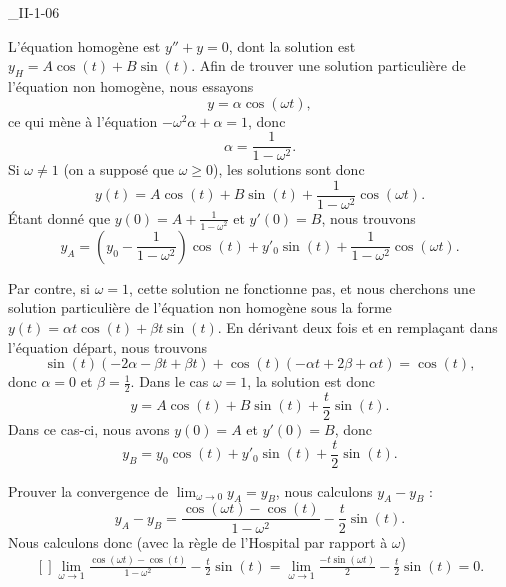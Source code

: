 

\begin{corrige}{_II-1-06}

L'équation homogène est $y''+y=0$, dont la solution est $y_H=A\cos(t)+B\sin(t)$. Afin de trouver une solution particulière de l'équation non homogène, nous essayons
\begin{equation}
	y=\alpha\cos(\omega t),
\end{equation}
ce qui mène à l'équation $-\omega^2\alpha+\alpha=1$, donc
\begin{equation}
	\alpha=\frac{1}{ 1-\omega^2 }.
\end{equation}
Si $\omega\neq 1$ (on a supposé que $\omega\geq0$), les solutions sont donc
\begin{equation}
	y(t)=A\cos(t)+B\sin(t)+\frac{1}{ 1-\omega^2 }\cos(\omega t).
\end{equation}
Étant donné que $y(0)=A+\frac{1}{ 1-\omega^2 }$ et $y'(0)=B$, nous trouvons
\begin{equation}
	y_A=\left( y_0-\frac{1}{ 1-\omega^2 } \right)\cos(t)+y'_0\sin(t)+\frac{1}{ 1-\omega^2 }\cos(\omega t).
\end{equation}

Par contre, si $\omega=1$, cette solution ne fonctionne pas, et nous cherchons une solution particulière de l'équation non homogène sous la forme $y(t)=\alpha t\cos(t)+\beta t\sin(t)$. En dérivant deux fois et en remplaçant dans l'équation départ, nous trouvons
\begin{equation}
	\sin(t)(-2\alpha-\beta t+\beta t)+\cos(t)(-\alpha t+2\beta+\alpha t)=\cos(t),
\end{equation}
donc $\alpha=0$ et $\beta=\frac{ 1 }{2}$. Dans le cas $\omega=1$, la solution est donc
\begin{equation}
	y=A\cos(t)+B\sin(t)+\frac{ t }{ 2 }\sin(t).
\end{equation}
Dans ce cas-ci, nous avons $y(0)=A$ et $y'(0)=B$, donc
\begin{equation}
	y_B=y_0\cos(t)+y'_0\sin(t)+\frac{ t }{2}\sin(t).
\end{equation}

Prouver la convergence de $\lim_{\omega\to 0}y_A=y_B$, nous calculons $y_A-y_B$ :
\begin{equation}
	y_A-y_B=\frac{ \cos(\omega t)-\cos(t) }{ 1-\omega^2 }-\frac{ t }{2}\sin(t).
\end{equation}
Nous calculons donc (avec la règle de l'Hospital par rapport à $\omega$)
\begin{equation}
	\begin{aligned}[]
		\lim_{\omega\to 1}\frac{ \cos(\omega t)-\cos(t) }{ 1-\omega^2 }-\frac{ t }{2}\sin(t)=\lim_{\omega\to 1}\frac{ -t\sin(\omega t) }{2}-\frac{ t }{2}\sin(t)=0.
	\end{aligned}
\end{equation}

\end{corrige}
